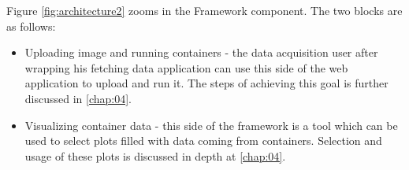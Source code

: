 Figure \ref{fig:architecture2} zooms in the Framework component. The two blocks are as follows:
\begin{itemize}
	\item Uploading image and running containers - the data acquisition user after wrapping his fetching data application can use this side of the web application to upload and run it. The steps of achieving this goal is further discussed in \autoref{chap:04}.
	\item Visualizing container data - this side of the framework is a tool which can be used to select plots filled with data coming from containers. Selection and usage of these plots is discussed in depth at \autoref{chap:04}.
\end{itemize}

